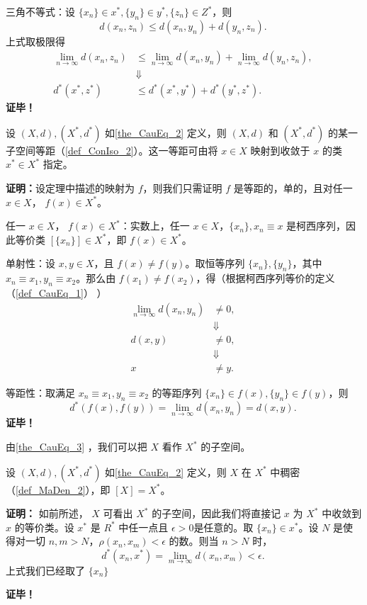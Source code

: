 三角不等式：设 $\{x_n\}\in x^*,\{y_n\}\in y^*,\{z_n\}\in Z^*$，则
\begin{equation}
d(x_n,z_n)\leq d(x_n,y_n)+d(y_n,z_n).~
\end{equation}
上式取极限得
\begin{equation}
\begin{aligned}
\lim_{n\rightarrow\infty}d(x_n,z_n)&\leq \lim_{n\rightarrow\infty}d(x_n,y_n)+\lim_{n\rightarrow\infty}d(y_n,z_n),\\
&\Downarrow\\
d^*(x^*,z^*)&\leq d^*(x^*,y^*)+d^*(y^*,z^*).
\end{aligned}
~
\end{equation}
\textbf{证毕！}

\begin{theorem}{}\label{the_CauEq_3}
设 $(X,d),(X^*,d^*)$ 如\autoref{the_CauEq_2} 定义，则 $(X,d)$ 和 $(X^*,d^*)$ 的某一子空间等距（\autoref{def_ConIso_2}）。这一等距可由将 $x\in X$ 映射到收敛于 $x$ 的类 $x^*\in X^*$ 指定。
\end{theorem}

\textbf{证明：}设定理中描述的映射为 $f$，则我们只需证明 $f$ 是等距的，单的，且对任一 $x\in X$， $f(x)\in X^*$。


任一 $x\in X$， $f(x)\in X^*$：实数上，任一 $x\in X$，$\{x_n\},x_n\equiv x$ 是柯西序列，因此等价类 $[\{x_n\}]\in X^*$，即 $f(x)\in X^*$。

单射性：设 $x, y\in X$，且 $f(x)\neq f(y)$。取恒等序列 $\{x_n\},\{y_n\}$，其中 $x_n\equiv x_1,y_n\equiv x_2$。那么由 $f(x_1)\neq f(x_2)$，得（根据柯西序列等价的定义（\autoref{def_CauEq_1}） ）
\begin{equation}
\begin{aligned}
\lim_{n\rightarrow\infty}d(x_n,y_n)&\neq 0,\\
&\Downarrow\\
d(x,y)&\neq0,\\
&\Downarrow\\
x&\neq y.
\end{aligned}~
\end{equation}

等距性：取满足 $x_n\equiv x_1,y_n\equiv x_2$ 的等距序列 $\{x_n\}\in f(x),\{y_n\}\in f(y)$，则
\begin{equation}
d^*(f(x),f(y))=\lim_{n\rightarrow\infty}d(x_n,y_n)=d(x,y).~
\end{equation}
\textbf{证毕！}

由\autoref{the_CauEq_3} ，我们可以把 $X$ 看作 $X^*$ 的子空间。

\begin{theorem}{}
设 $(X,d),(X^*,d^*)$ 如\autoref{the_CauEq_2} 定义，则 $X$ 在 $X^*$ 中稠密（\autoref{def_MaDen_2}），即 $[X]=X^*$。
\end{theorem}

\textbf{证明：}
如前所述， $X$ 可看出 $X^*$ 的子空间，因此我们将直接记 $x$ 为 $X^*$ 中收敛到 $x$ 的等价类。设 $x^*$ 是 $R^*$ 中任一点且 $\epsilon>0$是任意的。取 $\{x_n\}\in x^*$。设 $N$ 是使得对一切 $n,m>N$，$\rho(x_n,x_m)<\epsilon$ 的数。则当 $n>N$ 时，
\begin{equation}
d^*(x_n,x^*)=\lim_{m\rightarrow\infty} d(x_n,x_m)<\epsilon.~
\end{equation}
上式我们已经取了 $\{x_n\}$


\textbf{证毕！}
